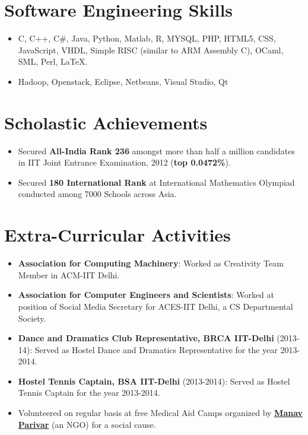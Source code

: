 \documentclass[10pt]{article} %
\begin{document}
\section{Software Engineering Skills}
\begin{itemize}
	\item { C, C++, C\#, Java, Python, Matlab, R, MYSQL, PHP, HTML5, CSS, JavaScript, VHDL, Simple RISC (similar to ARM Assembly C), OCaml, SML, Perl, LaTeX. }
	\item  {Hadoop, Openstack, Eclipse, Netbeans, Visual Studio, Qt}  
\end{itemize}


\section{Scholastic Achievements}
\begin{itemize}
	\item Secured {\bf All-India Rank 236} amongst more than half a million candidates  in IIT Joint Entrance Examination, 2012 ({\bf top 0.0472\%}).
	\item Secured {\bf 180 International Rank} at International Mathematics Olympiad conducted among 7000 Schools across Asia.
\end{itemize}


\section{Extra-Curricular Activities}
\begin{itemize}
	\item {\bf Association for Computing Machinery}: Worked as Creativity Team Member in ACM-IIT Delhi. 
	\item {\bf Association for Computer Engineers and Scientists}: Worked at position of Social Media Secretary for ACES-IIT Delhi, a CS Departmental Society.
	\item {\bf Dance and Dramatics Club Representative, BRCA IIT-Delhi} (2013-14): Served as Hostel Dance and Dramatics Representative 		for the year 2013-2014.
	\item {\bf Hostel Tennis Captain, BSA IIT-Delhi} (2013-2014): Served as Hostel Tennis Captain for the year 2013-2014.
	\item Volunteered on regular basis at free Medical Aid Camps organized by \href{http://www.manavparivar.org/index.htm}{\bf Manav Parivar} (an NGO) for a social cause.
\end{itemize}


\end{document}
